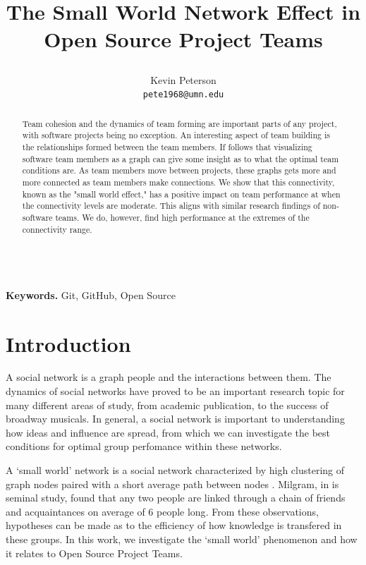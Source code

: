 \documentclass{proc}
\title{
The Small World Network Effect in Open Source Project Teams
\author{Kevin Peterson\\
\small \texttt{pete1968@umn.edu}
}
}
\begin{document}
\maketitle

\begin{abstract}
Team cohesion and the dynamics of team forming are important parts of any project, with software projects being no exception. An interesting aspect of team building is the relationships formed between the team members. If follows that visualizing software team members as a graph can give some insight as to what the optimal team conditions are. As team members move between projects, these graphs gets more and more connected as team members make connections. We show that this connectivity, known as the "small world effect," has a positive impact on team performance at when the connectivity levels are moderate. This aligns with similar research findings of non-software teams. We do, however, find high performance at the extremes of the connectivity range.
\end{abstract}

\noindent \\\textbf{Keywords.} Git, GitHub, Open Source

\section{Introduction}
A social network is a graph people and the interactions between them. The dynamics of social networks have proved to be an important research topic for many different areas of study, from academic publication\cite{barabasi2002evolution}, to the success of broadway musicals\cite{uzzi2005collaboration}. In general, a social network is important to understanding how ideas and influence are spread\cite{kempe2003maximizing}, from which we can investigate the best conditions for optimal group perfomance within these networks.

A `small world' network is a social network characterized by high clustering of graph nodes paired with a short average path between nodes \cite{watts1998collective}. Milgram, in is seminal study, found that any two people are linked through a chain of friends and acquaintances on average of 6 people long\cite{milgram1967small}. From these observations, hypotheses can be made as to the efficiency of how knowledge is transfered in these groups\cite{latora2001efficient}. In this work, we investigate the `small world' phenomenon and how it relates to Open Source Project Teams.
\end{document}
